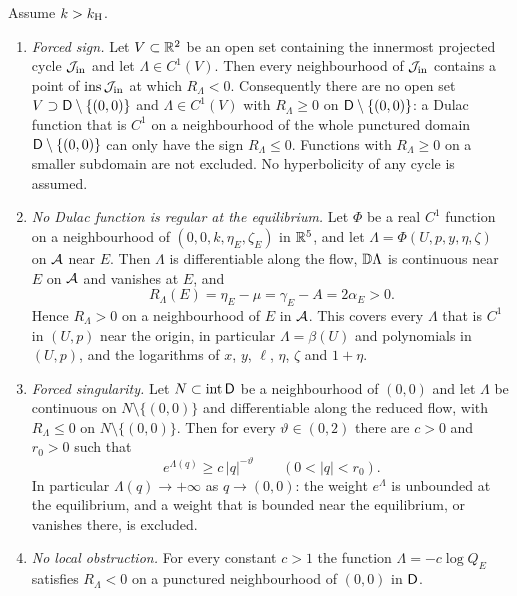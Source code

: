 \begin{proposition}\label{prop:nodulac}
Assume $k>k_{\mathrm H}$.
\begin{enumerate}[label=\textup{(\roman*)}]
\item \emph{Forced sign.} Let $V\subset\mathbb R^2$ be an open set containing the innermost projected cycle $\mathcal J_{\rm in}$ and let $\Lambda\in C^1(V)$. Then every neighbourhood of $\mathcal J_{\rm in}$ contains a point of $\operatorname{ins}\mathcal J_{\rm in}$ at which $R_\Lambda<0$. Consequently there are no open set $V\supset\mathsf D\setminus\{(0,0)\}$ and $\Lambda\in C^1(V)$ with $R_\Lambda\ge0$ on $\mathsf D\setminus\{(0,0)\}$: a Dulac function that is $C^1$ on a neighbourhood of the whole punctured domain $\mathsf D\setminus\{(0,0)\}$ can only have the sign $R_\Lambda\le0$. Functions with $R_\Lambda\ge0$ on a smaller subdomain are not excluded. No hyperbolicity of any cycle is assumed.
\item \emph{No Dulac function is regular at the equilibrium.} Let $\Phi$ be a real $C^1$ function on a neighbourhood of $(0,0,k,\eta_E,\zeta_E)$ in $\mathbb R^5$, and let $\Lambda=\Phi(U,p,y,\eta,\zeta)$ on $\mathcal A$ near $E$. Then $\Lambda$ is differentiable along the flow, $\mathbb D\Lambda$ is continuous near $E$ on $\mathcal A$ and vanishes at $E$, and
\[
R_\Lambda(E)=\eta_E-\mu=\gamma_E-A=2\alpha_E>0 .
\]
Hence $R_\Lambda>0$ on a neighbourhood of $E$ in $\mathcal A$. This covers every $\Lambda$ that is $C^1$ in $(U,p)$ near the origin, in particular $\Lambda=\beta(U)$ and polynomials in $(U,p)$, and the logarithms of $x$, $y$, $\ell$, $\eta$, $\zeta$ and $1+\eta$.
\item \emph{Forced singularity.} Let $N\subset\operatorname{int}\mathsf D$ be a neighbourhood of $(0,0)$ and let $\Lambda$ be continuous on $N\setminus\{(0,0)\}$ and differentiable along the reduced flow, with $R_\Lambda\le0$ on $N\setminus\{(0,0)\}$. Then for every $\vartheta\in(0,2)$ there are $c>0$ and $r_0>0$ such that
\[
e^{\Lambda(q)}\ge c\,|q|^{-\vartheta}\qquad(0<|q|<r_0).
\]
In particular $\Lambda(q)\to+\infty$ as $q\to(0,0)$: the weight $e^\Lambda$ is unbounded at the equilibrium, and a weight that is bounded near the equilibrium, or vanishes there, is excluded.
\item \emph{No local obstruction.} For every constant $c>1$ the function $\Lambda=-c\log Q_E$ satisfies $R_\Lambda<0$ on a punctured neighbourhood of $(0,0)$ in $\mathsf D$.
\end{enumerate}
\end{proposition}
